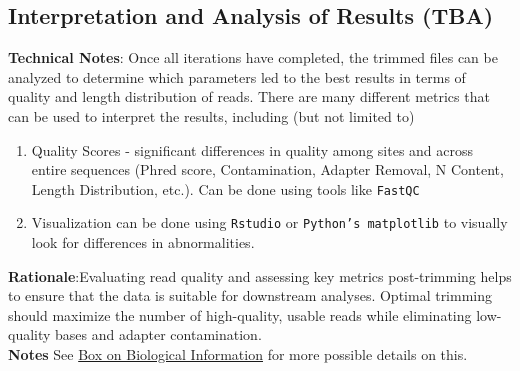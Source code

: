 \documentclass[11pt]{report}
\begin{document}
\subsection{Interpretation and Analysis of Results (TBA)}
\textbf{Technical Notes}: Once all iterations have completed, the trimmed files can be analyzed to determine which parameters led to the best results in terms of quality and length distribution of reads. There are many different metrics that can be used to interpret the results, including (but not limited to)
\begin{enumerate}
	\item Quality Scores - significant differences in quality among sites and across entire sequences (Phred score, Contamination, Adapter Removal, N Content, Length Distribution, etc.). Can be done using tools like \texttt{FastQC}
	\item Visualization can be done using \texttt{Rstudio} or \texttt{Python's matplotlib} to visually look for differences in abnormalities. 
\end{enumerate} 
\textbf{Rationale}:Evaluating read quality and assessing key metrics post-trimming helps to ensure that the data is suitable for downstream analyses. Optimal trimming should maximize the number of high-quality, usable reads while eliminating low-quality bases and adapter contamination.\\ 
\textbf{Notes} See \hyperref[box:biological information]{Box on Biological Information} for more possible details on this. 
\end{document}
